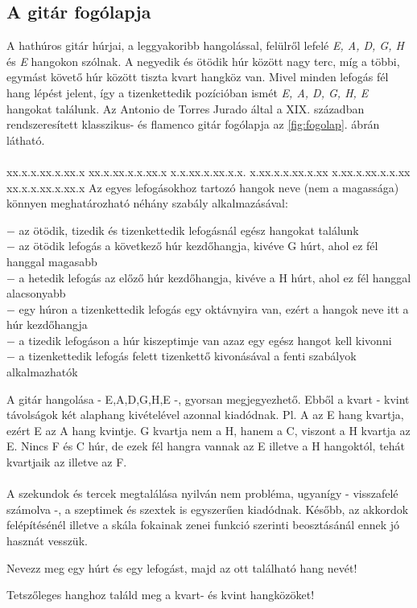 \label{tab:hangkozok}
\subsection{A gitár fogólapja}
\label{sec:gitarfogolap}
A hathúros gitár húrjai, a leggyakoribb hangolással, felülről lefelé \textit{E, A, D, G, H} és \textit{E} hangokon szólnak. A negyedik és ötödik húr között nagy terc, míg a többi, egymást követő húr között tiszta kvart hangköz van. Mivel minden lefogás fél hang lépést jelent, így a tizenkettedik pozícióban ismét \textit{E, A, D, G, H, E} hangokat találunk. Az Antonio de Torres Jurado által a XIX. században rendszeresített klasszikus- és flamenco gitár fogólapja az \ref{fig:fogolap}. ábrán látható.\\\\
          {xx.x.x.xx.x.xx.x%
           xx.x.xx.x.x.xx.x%
           x.x.xx.x.xx.x.x.%
           x.xx.x.x.xx.x.xx%
           x.xx.x.xx.x.x.xx%
           xx.x.x.xx.x.xx.x}
Az egyes lefogásokhoz tartozó hangok neve (nem a magassága) könnyen meghatározható néhány szabály alkalmazásával:
\begin{pitemize}
$-$ az ötödik, tizedik és tizenkettedik lefogásnál egész hangokat találunk  \\
$-$ az ötödik lefogás a következő húr kezdőhangja, kivéve G húrt, ahol ez fél hanggal magasabb  \\
$-$ a hetedik lefogás az előző húr kezdőhangja, kivéve a H húrt, ahol ez fél hanggal alacsonyabb \\
$-$ egy húron a tizenkettedik lefogás egy oktávnyira van, ezért a hangok neve itt a húr kezdőhangja \\
$-$ a tizedik lefogáson a húr kiszeptimje van azaz egy egész hangot kell kivonni \\
$-$ a tizenkettedik lefogás felett tizenkettő kivonásával a fenti szabályok alkalmazhatók \\
\end{pitemize}
A gitár hangolása - E,A,D,G,H,E -, gyorsan megjegyezhető. Ebből a kvart - kvint távolságok két alaphang kivételével azonnal kiadódnak. Pl. A az E hang kvartja, ezért E az A hang kvintje. G kvartja nem a H, hanem a C, viszont a H kvartja az E. Nincs F és C húr, de ezek fél hangra vannak az E illetve a H hangoktól, tehát kvartjaik az \aisz illetve az F. \\\\
A szekundok és tercek megtalálása nyilván nem probléma, ugyanígy - visszafelé számolva -, a szeptimek és szextek is egyszerűen kiadódnak. Később, az akkordok felépítésénél illetve a skála fokainak zenei funkció szerinti beosztásánál ennek jó hasznát vesszük.
\begin{practices}
\item Nevezz meg egy húrt és egy lefogást, majd az ott található hang nevét!
\item Tetszőleges hanghoz találd meg a kvart- és kvint hangközöket!
\end{practices}
